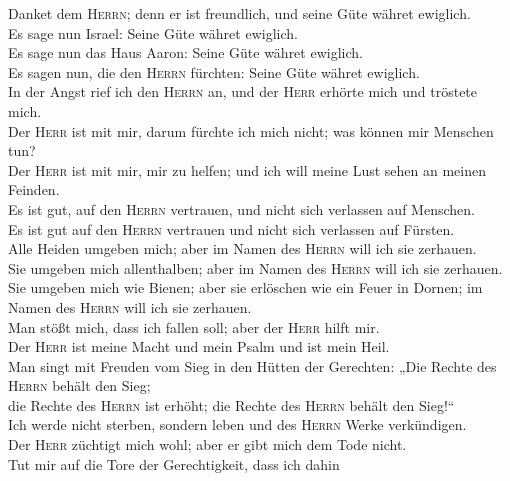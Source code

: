  Danket dem \textsc{Herrn}; denn er ist freundlich, und
seine Güte währet ewiglich.\\
 Es sage nun Israel: Seine Güte währet ewiglich.\\
 Es sage nun das Haus Aaron: Seine Güte währet ewiglich.\\
 Es sagen nun, die den \textsc{Herrn} fürchten: Seine Güte
währet ewiglich.\\
 In der Angst rief ich den \textsc{Herrn} an, und der
\textsc{Herr} erhörte mich und tröstete mich.\\
 Der \textsc{Herr} ist mit mir, darum fürchte ich mich
nicht; was können mir Menschen tun?\\
 Der \textsc{Herr} ist mit mir, mir zu helfen; und ich
will meine Lust sehen an meinen Feinden.\\
 Es ist gut, auf den \textsc{Herrn} vertrauen, und nicht
sich verlassen auf Menschen.\\
 Es ist gut auf den \textsc{Herrn} vertrauen und nicht
sich verlassen auf Fürsten.\\
 Alle Heiden umgeben mich; aber im Namen des
\textsc{Herrn} will ich sie zerhauen.\\
 Sie umgeben mich allenthalben; aber im Namen des
\textsc{Herrn} will ich sie zerhauen.\\
 Sie umgeben mich wie Bienen; aber sie erlöschen wie ein
Feuer in Dornen; im Namen des \textsc{Herrn} will ich sie zerhauen.\\
 Man stößt mich, dass ich fallen soll; aber der
\textsc{Herr} hilft mir.\\
 Der \textsc{Herr} ist meine Macht und mein Psalm und ist
mein Heil.\\
 Man singt mit Freuden vom Sieg in den Hütten der
Gerechten: „Die Rechte des \textsc{Herrn} behält den Sieg;\\
 die Rechte des \textsc{Herrn} ist erhöht; die Rechte des
\textsc{Herrn} behält den Sieg!{}``\\
 Ich werde nicht sterben, sondern leben und des
\textsc{Herrn} Werke verkündigen.\\
 Der \textsc{Herr} züchtigt mich wohl; aber er gibt mich
dem Tode nicht.\\
 Tut mir auf die Tore der Gerechtigkeit, dass ich dahin
